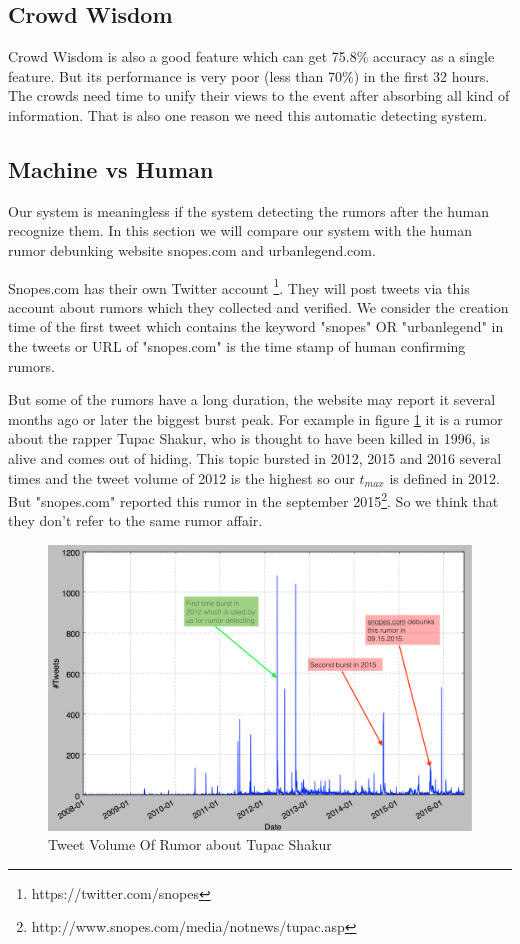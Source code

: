   
 \subsection{Crowd Wisdom} 
Crowd Wisdom is also a good feature which can get 75.8\% accuracy as a single feature. But its performance is very poor (less than 70\%) in the first 32 hours. The crowds need time to unify their views to the event after absorbing all kind of information. That is also one reason we need this automatic detecting system. 

 \subsection{Machine vs Human } 
 Our system is meaningless if the system detecting the rumors after the human recognize them. In this section we will compare our system with the human rumor debunking website snopes.com and urbanlegend.com. 
 
 Snopes.com has their own Twitter account \footnote{https://twitter.com/snopes}. They will post tweets via this account about rumors which they collected and verified. We consider the creation time of the first tweet which contains the keyword "snopes" OR "urbanlegend" in the tweets or URL of "snopes.com" is the time stamp of human confirming rumors. 


   But some of the rumors have a long duration, the website may report it several months ago or later the biggest burst peak. For example in figure \ref{fig:Multipike} it is a rumor about the rapper Tupac Shakur, who is thought to have been killed in 1996, is alive and comes out of hiding. This topic bursted in 2012, 2015 and 2016 several times and the tweet volume of 2012 is the highest so our $t_{max}$ is defined in 2012. But "snopes.com" reported this rumor in the september 2015\footnote{http://www.snopes.com/media/notnews/tupac.asp}. So we think that they don't refer to the same rumor affair.
  \begin{figure}[!h]
\centering
\includegraphics[width=\columnwidth]{images/mutipikehiding.png}
\caption{Tweet Volume Of Rumor about Tupac Shakur}
\label{fig:Multipike}
\end{figure}   
   
